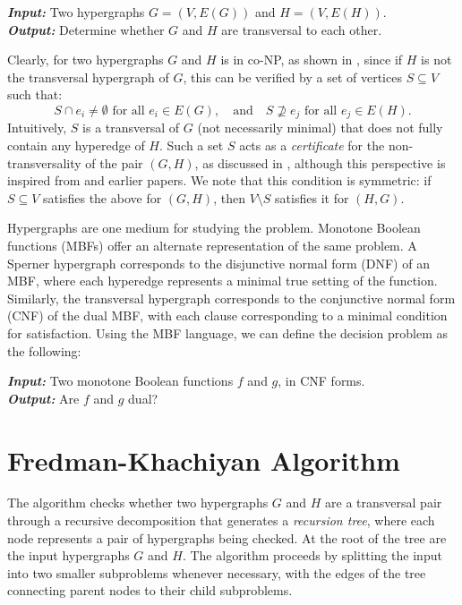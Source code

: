 \begin{problem}
\textbf{\textit{Input:}} Two hypergraphs $G=(V,E(G))$ and $H=(V,E(H))$.\\
\textbf{\textit{Output:}} Determine whether $G$ and $H$ are transversal to each other.
\end{problem}

Clearly, \TransHyp{} for two hypergraphs $G$ and $H$ is in co-NP, as shown in \cite{FK96}, since if $H$ is not the transversal hypergraph of $G$, this can be verified by a set of vertices $S\subseteq V$ such that:
\begin{equation}\label{eq:witness}
S\cap e_i\neq\emptyset\text{ for all }e_i\in E(G),\quad\text{and}\quad S\nsupseteq e_j\text{ for all }e_j\in E(H).
\end{equation}
Intuitively, $S$ is a transversal of $G$ (not necessarily minimal) that does not fully contain any hyperedge of $H$. Such a set $S$ acts as a \emph{certificate} for the non-transversality of the pair $(G,H)$, as discussed in \cite{Rau11}, although this perspective is inspired from \cite{FK96} and earlier papers. We note that this condition is symmetric: if $S\subseteq V$ satisfies the above for $(G,H)$, then $V\setminus S$ satisfies it for $(H,G)$.

Hypergraphs are one medium for studying the \TransHyp{} problem. Monotone Boolean functions (MBFs) offer an alternate representation of the same problem. A Sperner hypergraph corresponds to the disjunctive normal form (DNF) of an MBF, where each hyperedge represents a minimal true setting of the function. Similarly, the transversal hypergraph corresponds to the conjunctive normal form (CNF) of the dual MBF, with each clause corresponding to a minimal condition for satisfaction. Using the MBF language, we can define the decision problem as the following:

\begin{problem}
\textbf{\textit{Input:}} Two monotone Boolean functions $f$ and $g$, in CNF forms.\\
\textbf{\textit{Output:}} Are $f$ and $g$ dual?
\end{problem}

\section{Fredman-Khachiyan Algorithm \FKA}

The \FKA{} algorithm checks whether two hypergraphs $G$ and $H$ are a transversal pair through a recursive decomposition that generates a \emph{recursion tree}, where each node represents a pair of hypergraphs being checked. At the root of the tree are the input hypergraphs $G$ and $H$. The algorithm proceeds by splitting the input into two smaller subproblems whenever necessary, with the edges of the tree connecting parent nodes to their child subproblems.

